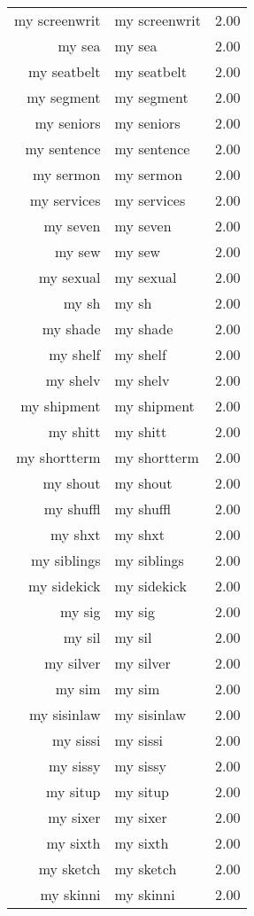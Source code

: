 \begin{table}[ht]
\begin{tabular}{rlr}
  my screenwrit & my screenwrit & 2.00 \\ 
  my sea & my sea & 2.00 \\ 
  my seatbelt & my seatbelt & 2.00 \\ 
  my segment & my segment & 2.00 \\ 
  my seniors & my seniors & 2.00 \\ 
  my sentence & my sentence & 2.00 \\ 
  my sermon & my sermon & 2.00 \\ 
  my services & my services & 2.00 \\ 
  my seven & my seven & 2.00 \\ 
  my sew & my sew & 2.00 \\ 
  my sexual & my sexual & 2.00 \\ 
  my sh & my sh & 2.00 \\ 
  my shade & my shade & 2.00 \\ 
  my shelf & my shelf & 2.00 \\ 
  my shelv & my shelv & 2.00 \\ 
  my shipment & my shipment & 2.00 \\ 
  my shitt & my shitt & 2.00 \\ 
  my shortterm & my shortterm & 2.00 \\ 
  my shout & my shout & 2.00 \\ 
  my shuffl & my shuffl & 2.00 \\ 
  my shxt & my shxt & 2.00 \\ 
  my siblings & my siblings & 2.00 \\ 
  my sidekick & my sidekick & 2.00 \\ 
  my sig & my sig & 2.00 \\ 
  my sil & my sil & 2.00 \\ 
  my silver & my silver & 2.00 \\ 
  my sim & my sim & 2.00 \\ 
  my sisinlaw & my sisinlaw & 2.00 \\ 
  my sissi & my sissi & 2.00 \\ 
  my sissy & my sissy & 2.00 \\ 
  my situp & my situp & 2.00 \\ 
  my sixer & my sixer & 2.00 \\ 
  my sixth & my sixth & 2.00 \\ 
  my sketch & my sketch & 2.00 \\ 
  my skinni & my skinni & 2.00 \\ 

\end{tabular}
\end{table}
